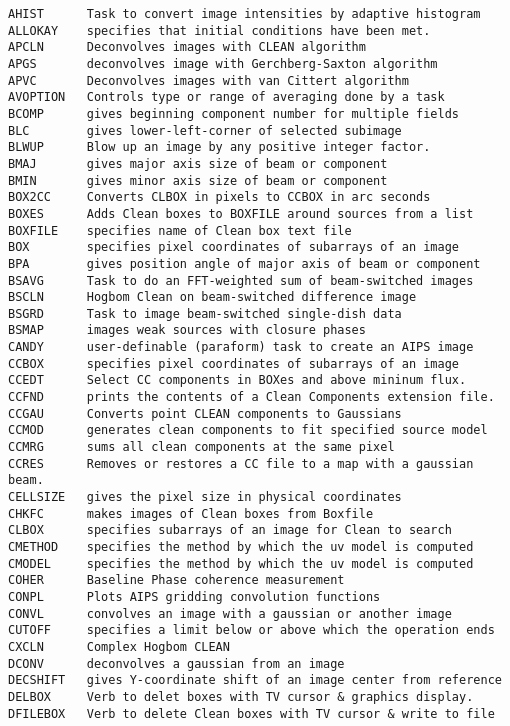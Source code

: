 \vskip 0.5pt
\bbve\begin{verbatim}
AHIST      Task to convert image intensities by adaptive histogram
ALLOKAY    specifies that initial conditions have been met.
APCLN      Deconvolves images with CLEAN algorithm
APGS       deconvolves image with Gerchberg-Saxton algorithm
APVC       Deconvolves images with van Cittert algorithm
AVOPTION   Controls type or range of averaging done by a task
BCOMP      gives beginning component number for multiple fields
BLC        gives lower-left-corner of selected subimage
BLWUP      Blow up an image by any positive integer factor.
BMAJ       gives major axis size of beam or component
BMIN       gives minor axis size of beam or component
BOX2CC     Converts CLBOX in pixels to CCBOX in arc seconds
BOXES      Adds Clean boxes to BOXFILE around sources from a list
BOXFILE    specifies name of Clean box text file
BOX        specifies pixel coordinates of subarrays of an image
BPA        gives position angle of major axis of beam or component
BSAVG      Task to do an FFT-weighted sum of beam-switched images
BSCLN      Hogbom Clean on beam-switched difference image
BSGRD      Task to image beam-switched single-dish data
BSMAP      images weak sources with closure phases
CANDY      user-definable (paraform) task to create an AIPS image
CCBOX      specifies pixel coordinates of subarrays of an image
CCEDT      Select CC components in BOXes and above mininum flux.
CCFND      prints the contents of a Clean Components extension file.
CCGAU      Converts point CLEAN components to Gaussians
CCMOD      generates clean components to fit specified source model
CCMRG      sums all clean components at the same pixel
CCRES      Removes or restores a CC file to a map with a gaussian beam.
CELLSIZE   gives the pixel size in physical coordinates
CHKFC      makes images of Clean boxes from Boxfile
CLBOX      specifies subarrays of an image for Clean to search
CMETHOD    specifies the method by which the uv model is computed
CMODEL     specifies the method by which the uv model is computed
COHER      Baseline Phase coherence measurement
CONPL      Plots AIPS gridding convolution functions
CONVL      convolves an image with a gaussian or another image
CUTOFF     specifies a limit below or above which the operation ends
CXCLN      Complex Hogbom CLEAN
DCONV      deconvolves a gaussian from an image
DECSHIFT   gives Y-coordinate shift of an image center from reference
DELBOX     Verb to delet boxes with TV cursor & graphics display.
DFILEBOX   Verb to delete Clean boxes with TV cursor & write to file

\end{verbatim}
